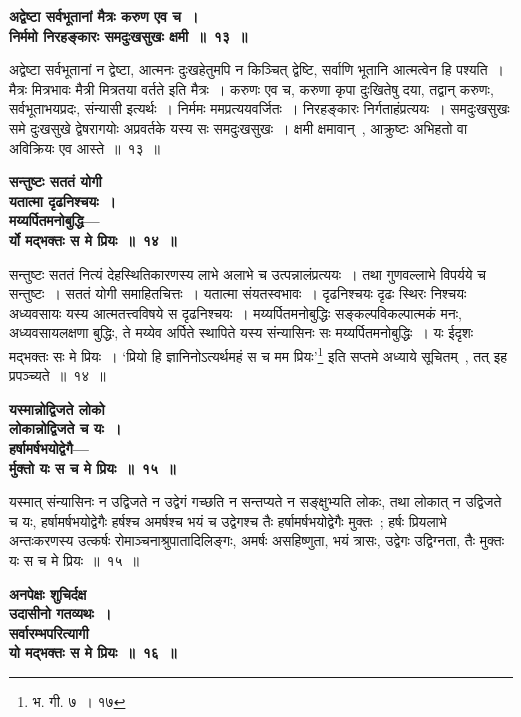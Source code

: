 \begin{center}{\bfseries अद्वेष्टा सर्वभूतानां मैत्रः करुण एव च~।\\निर्ममो निरहङ्कारः समदुःखसुखः क्षमी~॥~१३~॥}\end{center} 
अद्वेष्टा सर्वभूतानां न द्वेष्टा, आत्मनः दुःखहेतुमपि न किञ्चित् द्वेष्टि, सर्वाणि भूतानि आत्मत्वेन हि पश्यति~। मैत्रः मित्रभावः मैत्री मित्रतया वर्तते इति मैत्रः~। करुणः एव च, करुणा कृपा दुःखितेषु दया, तद्वान् करुणः, सर्वभूताभयप्रदः, संन्यासी इत्यर्थः~। निर्ममः ममप्रत्ययवर्जितः~। निरहङ्कारः निर्गताहंप्रत्ययः~। समदुःखसुखः समे दुःखसुखे द्वेषरागयोः अप्रवर्तके यस्य सः समदुःखसुखः~। क्षमी क्षमावान्~, आक्रुष्टः अभिहतो वा अविक्रियः एव आस्ते~॥~१३~॥\par
 \begin{center}{\bfseries सन्तुष्टः सततं योगी\\ यतात्मा दृढनिश्चयः~।\\मय्यर्पितमनोबुद्धि—\\ र्यो मद्भक्तः स मे प्रियः~॥~१४~॥}\end{center} 
सन्तुष्टः सततं नित्यं देहस्थितिकारणस्य लाभे अलाभे च उत्पन्नालंप्रत्ययः~। तथा गुणवल्लाभे विपर्यये च सन्तुष्टः~। सततं योगी समाहितचित्तः~। यतात्मा संयतस्वभावः~। दृढनिश्चयः दृढः स्थिरः निश्चयः अध्यवसायः यस्य आत्मतत्त्वविषये स दृढनिश्चयः~। मय्यर्पितमनोबुद्धिः सङ्कल्पविकल्पात्मकं मनः, अध्यवसायलक्षणा बुद्धिः, ते मय्येव अर्पिते स्थापिते यस्य संन्यासिनः सः मय्यर्पितमनोबुद्धिः~। यः ईदृशः मद्भक्तः सः मे प्रियः~। ‘प्रियो हि ज्ञानिनोऽत्यर्थमहं स च मम प्रियः’\footnote{भ. गी. ७~। १७} इति सप्तमे अध्याये सूचितम्~, तत् इह प्रपञ्च्यते~॥~१४~॥\par
 \begin{center}{\bfseries यस्मान्नोद्विजते लोको\\ लोकान्नोद्विजते च यः~।\\ हर्षामर्षभयोद्वेगै—\\ र्मुक्तो यः स च मे प्रियः~॥~१५~॥}\end{center} 
यस्मात् संन्यासिनः न उद्विजते न उद्वेगं गच्छति न सन्तप्यते न सङ्क्षुभ्यति लोकः, तथा लोकात् न उद्विजते च यः, हर्षामर्षभयोद्वेगैः हर्षश्च अमर्षश्च भयं च उद्वेगश्च तैः हर्षामर्षभयोद्वेगैः मुक्तः~; हर्षः प्रियलाभे अन्तःकरणस्य उत्कर्षः रोमाञ्चनाश्रुपातादिलिङ्गः, अमर्षः असहिष्णुता, भयं त्रासः, उद्वेगः उद्विग्नता, तैः मुक्तः यः स च मे प्रियः~॥~१५~॥\par
 \begin{center}{\bfseries अनपेक्षः शुचिर्दक्ष\\ उदासीनो गतव्यथः~।\\सर्वारम्भपरित्यागी\\ यो मद्भक्तः स मे प्रियः~॥~१६~॥}\end{center} 
